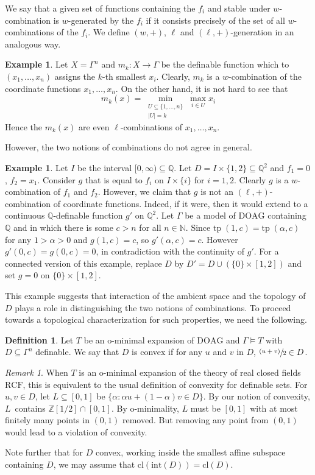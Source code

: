 \documentclass[10pt]{amsart}
\theoremstyle{definition}
\newtheorem{defi}[subsection]{Definition}
\newtheorem{exem}[subsection]{Example}
\theoremstyle{remark}
\newtheorem{rema}[subsection]{Remark}
\newcommand{\psfrac}[2]{\sfrac{(#1)}{#2}}
\newcommand{\cl}{\mathrm{cl}}
\newcommand{\tp}{\mathrm{tp\;}}
\newcommand{\DOAG}{\mathrm{DOAG}}
\newcommand{\N}{\mathbb N}
\newcommand{\Q}{\mathbb Q}
\newcommand{\Z}{\mathbb Z}
\theoremstyle{plain}
\theoremstyle{definition}
\begin{document}
We say that a given set of functions containing the $f_i$ and stable under $w$\nobreakdash-combi\-nation is $w$-generated by the $f_i$ if it consists precisely of the set of all $w$-combinations of the $f_i$. We define $(w,+)$, $\ell$ and $(\ell,+)$-generation in an analogous way.

\begin{exem}\label{eg:min-k}
Let $X=\Gamma^n$ and $m_k:X\to \Gamma$ be the definable function which to $(x_1,\ldots,x_n)$ assigns the $k$-th smallest $x_i$. Clearly, $m_k$ is a $w$-combination of the coordinate functions $x_1,\ldots,x_n$. On the other hand, it is not hard to see that
\[
m_k(x)=\min_{\substack{U\subseteq \{1,\ldots,n\}\\|U|=k}} \max_{i\in U} x_i
\]
Hence the $m_k(x)$ are even $\ell$-combinations of $x_1,\ldots,x_n$.
\end{exem}
However, the two notions of combinations do not agree in general.
\begin{exem}\label{eg:dl}
Let $I$ be the interval $[0,\infty)\subseteq \Q$.
Let $D= I\times \{1,2\}\subseteq\Q^2$ and $f_1=0$,
$f_2=x_1$. Consider $g$ that is equal to
$f_i$ on $I\times \{i\}$ for $i=1,2$. Clearly
$g$ is a $w$-combination of $f_1$ and $f_2$.
However, we claim that $g$ is not an $(\ell, +)$-combination
of coordinate functions.
Indeed, if it were, then it would extend to a continuous
$\Q$\nobreakdash-definable function $g'$ on $\Q^2$. Let $\Gamma$ be a model of $\DOAG$
containing $\Q$ and in which there is some $c>n$ for all $n\in\N$. Since $\tp(1,c)=\tp(\alpha,c)$ for any $1>\alpha>0$ and $g(1,c)=c$, so $g'(\alpha,c)=c$. However $g'(0,c)=g(0,c)=0$, in contradiction with the continuity of $g'$. For a connected version of this example, replace $D$ by $D'=D\cup (\{0\}\times [1,2])$ and set $g=0$ on $\{0\}\times [1,2]$.
\end{exem}
This example suggests that interaction of the ambient space and the topology of~$D$ plays a role in distinguishing the two notions of combinations. To proceed towards a topological characterization for such properties, we need the following.
\begin{defi}\label{def:convex} Let $T$ be an o-minimal expansion of $\DOAG$ and $\Gamma\models T$ with $D\subseteq \Gamma^n$ definable. We say that $D$ is convex if for any $u$
and $v$ in $D$, $\psfrac{u+v}{2}\in D$.
\end{defi}
\begin{rema}\label{rmk:rcf}
When $T$ is an o-minimal expansion of the theory of real closed fields $\mathrm{RCF}$, this is equivalent to the usual definition of convexity for definable sets. For $u,v\in D$, let $L\subseteq [0,1]$ be $\{\alpha: \alpha u+(1-\alpha)v \in D\}$. By our notion of convexity, $L$~contains $\Z[1/2]\cap [0,1]$. By o-minimality, $L$ must be $[0,1]$ with at most finitely many points in $(0,1)$ removed. But removing any point from $(0,1)$ would lead to a violation of convexity.

Note further that for $D$ convex, working inside the smallest affine subspace containing $D$, we may assume that $\cl(\mathrm{int}(D))=\cl(D)$.
\end{rema}
\end{document}

